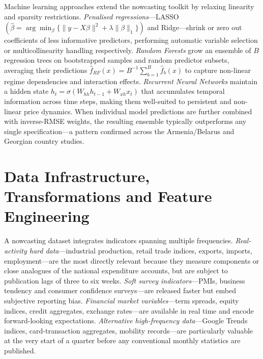 \documentclass[12pt,a4paper]{report}
\begin{document}
Machine learning approaches extend the nowcasting toolkit by relaxing
linearity and sparsity restrictions. \textit{Penalised
regressions}---LASSO \((\hat{\beta} = \arg\min_\beta \{\|y -
X\beta\|^2 + \lambda\|\beta\|_1\})\) and Ridge---shrink or zero out
coefficients of less informative predictors, performing automatic
variable selection or multicollinearity handling respectively.
\textit{Random Forests} grow an ensemble of \(B\) regression trees on
bootstrapped samples and random predictor subsets, averaging their
predictions \(\hat{f}_{RF}(x) = B^{-1}\sum_{b=1}^{B}\hat{f}_b(x)\)
to capture non-linear regime dependencies and interaction
effects.\citep{NetherlandsDNB2022} \textit{Recurrent Neural Networks}
maintain a hidden state \(h_t = \sigma(W_{hh}h_{t-1} + W_{xh}x_t)\)
that accumulates temporal information across time steps, making them
well-suited to persistent and non-linear price dynamics. When individual
model predictions are further combined with inverse-RMSE weights, the
resulting ensemble typically outperforms any single
specification---a pattern confirmed across the Armenia/Belarus and
Georgian country studies.\citep{ArmeniaBelarus2024}

\section{Data Infrastructure, Transformations and Feature Engineering}

A nowcasting dataset integrates indicators spanning multiple
frequencies. \textit{Real-activity hard data}---industrial production,
retail trade indices, exports, imports, employment---are the most
directly relevant because they measure components or close analogues of
the national expenditure accounts, but are subject to publication lags
of three to six weeks. \textit{Soft survey indicators}---PMIs, business
tendency and consumer confidence surveys---are released faster but embed
subjective reporting bias. \textit{Financial market variables}---term
spreads, equity indices, credit aggregates, exchange rates---are
available in real time and encode forward-looking expectations.
\textit{Alternative high-frequency data}---Google Trends indices,
card-transaction aggregates, mobility records---are particularly
valuable at the very start of a quarter before any conventional monthly
statistics are published.\citep{Georgia2022}
\end{document}
